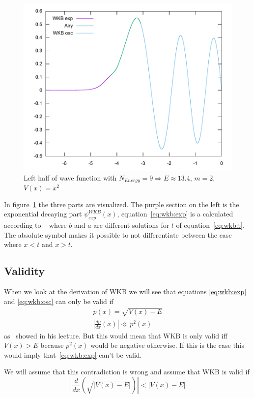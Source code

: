 \documentclass[11pt,DIV=10,final]{scrreprt} %
\begin{document}
\begin{figure}[H]
  \centering
  \includegraphics[width=.9\textwidth]{plots/square9half.pdf}
  \caption{Left half of wave function with $N_{Energy} = 9 \Rightarrow E \approx 13.4$, $m = 2$, $V(x) = x^{2}$}\label{fig:wave_parts}
\end{figure}
In figure~\ref{fig:wave_parts} the three parts are visualized. The purple section on the left is the exponential decaying part $\psi^{WKB}_{exp} (x)$, equation~\ref{eq:wkb:exp} is a calculated according to
~\cite[p. 317, Claim 15.7]{hall2013quantum} where $b$ and $a$ are different solutions for $t$ of equation~\ref{eq:wkb:t}. The absolute symbol makes it possible to not
differentiate between the case where $x < t$ and $x > t$.
\subsection{Validity}
When we look at the derivation of WKB we will see that equations \ref{eq:wkb:exp} and \ref{eq:wkb:osc} can only be valid if
\begin{align*}
  p(x) = \sqrt{V(x) - E} \\
  \left|\frac{dp}{dx}(x)\right| \ll p^{2}(x)
\end{align*}
as~\cite{zwiebach2018lecture} showed in his lecture.
But this would mean that WKB is only valid iff $V(x) > E$ because $p^{2}(x)$ would be negative otherwise.
If this is the case this would imply that~\ref{eq:wkb:exp} can't be valid.

We will assume that this contradiction is wrong and assume that WKB is valid if
\[
  \left|\frac{d}{dx}(\sqrt{|V(x) - E|})\right| < |V(x) - E|
\]
\end{document}
